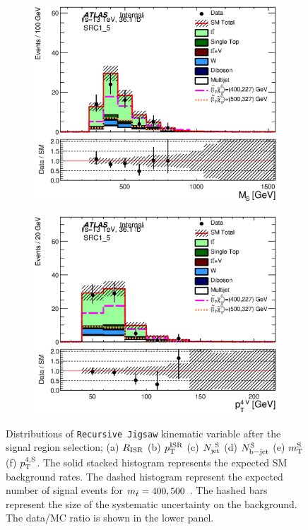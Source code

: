 \begin{figure}[h!]
\begin{center}
\begin{subfigure}[b]{0.40\textwidth}
    	 \includegraphics[width=\textwidth]{figures/plotRegion/CA_MS_SRC1_5.eps}
                \caption{ }
    \end{subfigure}
    \begin{subfigure}[b]{0.40\textwidth}    
    	 \includegraphics[width=\textwidth]{figures/plotRegion/CA_pTjV4_SRC1_5.eps}
               \caption{ }
    \end{subfigure}
     \caption[~Distributions of kinematic variable after the signal region selection]{ Distributions of {\tt Recursive Jigsaw} kinematic variable after the signal region selection;  (a) $R_{\mathrm{ISR}}$  (b) $p_{\mathrm{T}}^{\mathrm{ISR}}$ (c) $N_{\mathrm{jet}}^{~\mathrm{S}}$ (d) $N_{\mathrm{b-jet}}^{\mathrm{S}}$ (e) $m_{\mathrm{T}}^{\mathrm{S}}$ (f) $p_{\mathrm{T}}^{4,\mathrm{S}}$.  The solid stacked histogram represents the expected SM background rates. The dashed histogram represent the expected number of signal events for $m_{\tilde{t}} = 400,500$ \gev.  The hashed bars represent the size of the systematic uncertainty on the background.  The data/MC ratio is shown in the lower panel. }
  \label{fig:SR2}
  

\end{center}
\end{figure}
